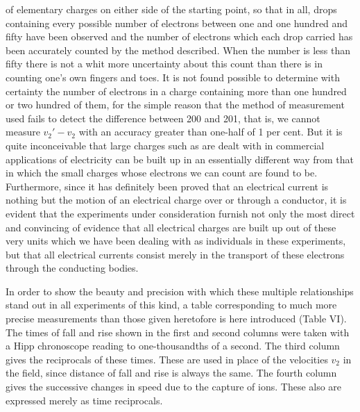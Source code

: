 of elementary charges on either side of the starting point, so that in
all, drops containing every possible number of electrons between one and
one hundred and fifty have been observed and the number of electrons
which each drop carried has been accurately counted by the method
described. When the number is less than fifty there is not a whit more
uncertainty about this count than there is in counting one's own fingers
and toes. It is not found possible to determine with certainty the
number of electrons in a charge containing more than one hundred or two
hundred of them, for the simple reason that the method of measurement
used fails to detect the difference between 200 and 201, that is, we
cannot measure $v_{2}' - v_2$ with an accuracy greater than
one-half of 1 per cent. But it is quite inconceivable that large charges
such as are dealt with in commercial applications of electricity can be
built up in an es\-sen\-tially different way from that in which the small
charges whose electrons we can count are found to be. Furthermore, since
it has definitely been proved that an electrical current is nothing but
the motion of an electrical charge over or through a conductor, it is
evident that the experiments under consideration furnish not only the
most direct and convincing of evidence that all electrical charges are
built up out of these very units which we have been dealing with as
individuals in these experiments, but that all electrical currents
consist merely in the transport of these electrons through the
conducting bodies.

In order to show the beauty and precision with which these multiple
relationships stand out in all experiments of this kind, a table
corresponding to much more precise measurements than those given
heretofore is here introduced (Table VI). The times of fall and rise
shown in the first and second columns were taken with a Hipp chronoscope
reading to one-thousandths of a second. The third column gives the
reciprocals of these times. These are used in place of the velocities
$v_2$ in the field, since distance of fall and rise is always the
same. The fourth column gives the successive changes in speed due to the
capture of ions. These also are expressed merely as time reciprocals.

